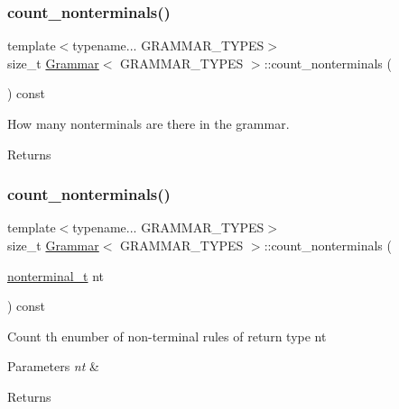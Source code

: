 \subsubsection{\texorpdfstring{count\+\_\+nonterminals()}{count\_nonterminals()}\hspace{0.1cm}{\footnotesize\ttfamily [1/2]}}
{\footnotesize\ttfamily template$<$typename... G\+R\+A\+M\+M\+A\+R\+\_\+\+T\+Y\+P\+ES$>$ \\
size\+\_\+t \hyperlink{class_grammar}{Grammar}$<$ G\+R\+A\+M\+M\+A\+R\+\_\+\+T\+Y\+P\+ES $>$\+::count\+\_\+nonterminals (\begin{DoxyParamCaption}{ }\end{DoxyParamCaption}) const\hspace{0.3cm}{\ttfamily [inline]}}

How many nonterminals are there in the grammar. \begin{DoxyReturn}{Returns}

\end{DoxyReturn}
\mbox{\label{class_grammar_a335c2679b0db2290a1a0da8910f0bcdd}} 
\subsubsection{\texorpdfstring{count\+\_\+nonterminals()}{count\_nonterminals()}\hspace{0.1cm}{\footnotesize\ttfamily [2/2]}}
{\footnotesize\ttfamily template$<$typename... G\+R\+A\+M\+M\+A\+R\+\_\+\+T\+Y\+P\+ES$>$ \\
size\+\_\+t \hyperlink{class_grammar}{Grammar}$<$ G\+R\+A\+M\+M\+A\+R\+\_\+\+T\+Y\+P\+ES $>$\+::count\+\_\+nonterminals (\begin{DoxyParamCaption}\item[{\hyperlink{_nonterminal_8h_a1c5bfe9b903f69c83bbde5da7035fef3}{nonterminal\+\_\+t}}]{nt }\end{DoxyParamCaption}) const\hspace{0.3cm}{\ttfamily [inline]}}

Count th enumber of non-\/terminal rules of return type nt 
\begin{DoxyParams}{Parameters}
{\em nt} & \\
\hline
\end{DoxyParams}
\begin{DoxyReturn}{Returns}

\end{DoxyReturn}
\mbox{\label{class_grammar_a90a765c97b89f2f4cf12b6b4c2a3d019}} 
